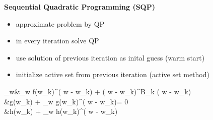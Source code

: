 \begin{tcolorbox}[colback=red!5!white,colframe=red!75!black,title=\textbf{Optimization Strategies}]
	\textbf{Sequential Quadratic Programming (SQP)}
	\begin{itemize}
		\item approximate problem by QP
		\item in every iteration solve QP
		\item use solution of previous iteration as  inital guess (warm start)
		\item initialize active set from previous iteration (active set method)
	\end{itemize}
		\begin{flalign*}
		\min_w\quad &\nabla_w f(w_k)^\top ( w - w_k) +  ( w - w_k)^\top B_k ( w - w_k)\\
		\quad &g(w_k) + \nabla_w g(w_k)^\top ( w - w_k)= 0\\
		&h(w_k) + \nabla_w h(w_k)^\top ( w - w_k) 
	\end{flalign*}

\end{tcolorbox}